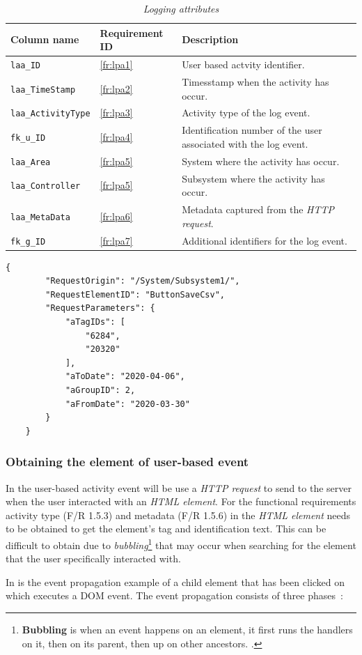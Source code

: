 \begin{table}[!htb]
	\centering
	\caption[Logging attributes]
	{\textit{Logging attributes}}
	\label{tbl:ch3_Log_Attributes}
	\begin{tabularx}{\textwidth}{|l|l|X|}
		\hline \textbf{Column name} & \textbf{Requirement ID} & \textbf{Description}\\
		\hline \texttt{laa\_ID} & \ref{fr:lpa1} & User based actvity identifier. \\
		\hline \texttt{laa\_TimeStamp} & \ref{fr:lpa2} & Timesstamp when the activity has occur. \\
		\hline \texttt{laa\_ActivityType} & \ref{fr:lpa3} & Activity type of the log event. \\
		\hline \texttt{fk\_u\_ID} & \ref{fr:lpa4} & Identification number of the user associated with the log event. \\
		\hline \texttt{laa\_Area} & \ref{fr:lpa5} & System where the activity has occur. \\
		\hline \texttt{laa\_Controller} & \ref{fr:lpa5} & Subsystem where the activity has occur. \\
		\hline \texttt{laa\_MetaData} & \ref{fr:lpa6} & Metadata captured from the \textit{HTTP request}. \\
		\hline \texttt{fk\_g\_ID} & \ref{fr:lpa7} & Additional identifiers for the log event. \\
		\hline
	\end{tabularx}
\end{table}

\begin{lstlisting}[style=json, caption={\textit{Metadata JSON}}, label={fig:ch3_MetadataJson}] 
	{
		"RequestOrigin": "/System/Subsystem1/",
		"RequestElementID": "ButtonSaveCsv",
		"RequestParameters": {
			"aTagIDs": [
				"6284",
				"20320"
			],
			"aToDate": "2020-04-06",
			"aGroupID": 2,
			"aFromDate": "2020-03-30"
		}
	}
\end{lstlisting}

\subsubsection{Obtaining the element of user-based event}\label{sec:ch2_ElementObtaining}
In  the user-based activity event will be use a \textit{HTTP request} to send to the server when the user interacted with an \textit{HTML element}. For the functional requirements activity type (F/R 1.5.3) and metadata (F/R 1.5.6) in  the \textit{HTML element} needs to be obtained to get the element's tag and identification text. This can be difficult to obtain due to \textit{bubbling}\footnote{\textbf{Bubbling} is when an event happens on an element, it first runs the handlers on it, then on its parent, then up on other ancestors. \cite{EventBubbling}.} that may occur when searching for the element that the user specifically interacted with.\par In  is the event propagation example of a child element that has been clicked on which executes a DOM event. The event propagation consists of three phases~\cite{EventBubbling}:

